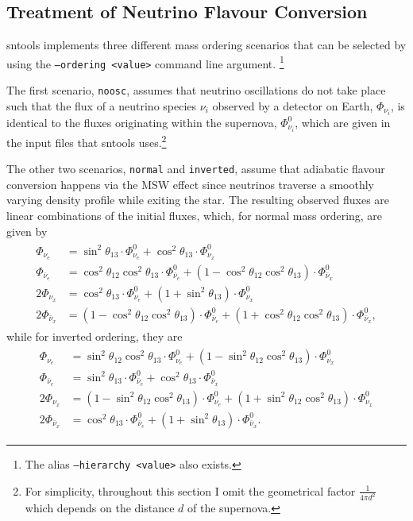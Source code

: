 \documentclass[11pt, oneside]{article}
\newcommand{\nue}{\ensuremath{\nu_e}\xspace}
\newcommand{\nux}{\ensuremath{\nu_x}\xspace}
\newcommand{\nuebar}{\ensuremath{\bar{\nu}_e}\xspace}
\newcommand{\nuxbar}{\ensuremath{\bar{\nu}_x}\xspace}
\begin{document}
\subsection{Treatment of Neutrino Flavour Conversion} \label{sec:mass-ordering}

sntools implements three different mass ordering scenarios that can be selected by using the \texttt{--ordering <value>} command line argument.%
\footnote{The alias \texttt{--hierarchy <value>} also exists.}

The first scenario, \texttt{noosc}, assumes that neutrino oscillations do not take place such that the flux of a neutrino species $\nu_i$ observed by a detector on Earth, $\Phi_{\nu_i}$, is identical to the fluxes originating within the supernova, $\Phi_{\nu_i}^0$, which are given in the input files that sntools uses.\footnote{For simplicity, throughout this section I omit the geometrical factor $\frac{1}{4 \pi d^2}$ which depends on the distance $d$ of the supernova.}

The other two scenarios, \texttt{normal} and \texttt{inverted}, assume that adiabatic flavour conversion happens via the MSW effect since neutrinos traverse a smoothly varying density profile while exiting the star.
The resulting observed fluxes are linear combinations of the initial fluxes, which, for normal mass ordering, are given by~\cite{Dighe2000}
\begin{align}
\begin{split}
\Phi_{\nue} &= \sin^2 \theta_{13} \cdot \Phi_{\nue}^0 + \cos^2 \theta_{13} \cdot \Phi_{\nux}^0\\
\Phi_{\nuebar} &= \cos^2 \theta_{12} \cos^2 \theta_{13} \cdot \Phi^0_{\nuebar} + (1 - \cos^2 \theta_{12} \cos^2 \theta_{13}) \cdot \Phi^0_{\nuxbar} \\
2 \Phi_{\nux} &= \cos^2 \theta_{13} \cdot \Phi^0_{\nue} + (1 + \sin^2 \theta_{13}) \cdot \Phi^0_{\nux} \\
2 \Phi_{\nuxbar} &= (1 - \cos^2 \theta_{12} \cos^2 \theta_{13}) \cdot \Phi^0_{\nuebar} + (1 + \cos^2 \theta_{12} \cos^2 \theta_{13}) \cdot \Phi^0_{\nuxbar},
\end{split}
\end{align}
while for inverted ordering, they are
\begin{align}
\begin{split}
\Phi_{\nue} &= \sin^2 \theta_{12} \cos^2 \theta_{13} \cdot \Phi_{\nue}^0 + (1 - \sin^2 \theta_{12} \cos^2 \theta_{13}) \cdot \Phi_{\nux}^0\\
\Phi_{\nuebar} &= \sin^2 \theta_{13} \cdot \Phi_{\nuebar}^0 + \cos^2 \theta_{13} \cdot \Phi_{\nuxbar}^0\\
2 \Phi_{\nux} &= (1 - \sin^2 \theta_{12} \cos^2 \theta_{13}) \cdot \Phi_{\nue}^0 + (1 + \sin^2 \theta_{12} \cos^2 \theta_{13}) \cdot \Phi_{\nux}^0\\
2 \Phi_{\nuxbar} &= \cos^2 \theta_{13} \cdot \Phi_{\nuebar}^0 + (1 + \sin^2 \theta_{13}) \cdot \Phi^0_{\nuxbar}.
\end{split}
\end{align}
\end{document}
